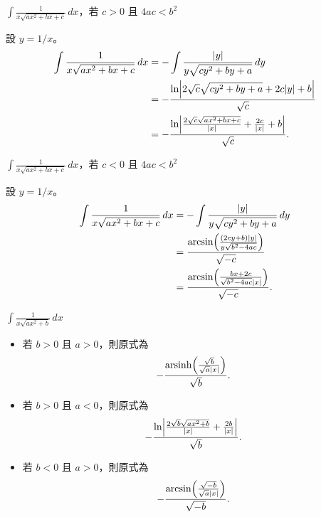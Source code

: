 \documentclass{beamer}
\newcommand{\Left} {\mathopen{}\mathclose\bgroup\left}
\newcommand{\Right}{\aftergroup\egroup\right}
\newcommand{\arsinh}{\operatorname{arsinh}}
\theoremstyle{remark}
\begin{document}
\begin{CJK}{UTF8}{bsmi}
\begin{frame}{$\displaystyle \int \frac{1}{x \sqrt{ax^2 + bx + c}}\,dx$，若 $c > 0$ 且 $4ac < b^2$}
  \begin{solution}
    設 $y = 1/x$。
    \begin{align*}
      \int \frac{1}{x \sqrt{ax^2 + bx + c}}\,dx &= -\int \frac{|y|}{y \sqrt{cy^2 + by + a}}\,dy\\
	&= -\frac{\ln \Left| 2 \sqrt c \sqrt{cy^2 + by + a} + 2c|y| + b \Right|}{\sqrt c}\\
	&= -\frac{\ln \Left| \frac{2 \sqrt c \sqrt{ax^2 + bx + c}}{|x|} + \frac{2c}{|x|} + b \Right|}{\sqrt c}.
    \end{align*}
  \end{solution}
\end{frame}

\begin{frame}{$\displaystyle \int \frac{1}{x \sqrt{ax^2 + bx + c}}\,dx$，若 $c < 0$ 且 $4ac < b^2$}
  \begin{solution}
    設 $y = 1/x$。
    \begin{align*}
      \int \frac{1}{x \sqrt{ax^2 + bx + c}}\,dx &= -\int \frac{|y|}{y \sqrt{cy^2 + by + a}}\,dy\\
	&= \frac{\arcsin \Left( \frac{\left( 2cy + b \right) |y|}{y \sqrt{b^2 - 4ac}} \Right)}{\sqrt{-c}}\\
	&= \frac{\arcsin \Left( \frac{bx + 2c}{\sqrt{b^2 - 4ac} |x|} \Right)}{\sqrt{-c}}.
    \end{align*}
  \end{solution}
\end{frame}

\begin{frame}{$\displaystyle \int \frac{1}{x \sqrt{ax^2 + b}}\,dx$}
  \begin{itemize}
    \item 若 $b > 0$ 且 $a > 0$，則原式為
      \[-\frac{\arsinh \Left( \frac{\sqrt b}{\sqrt a |x|} \Right)}{\sqrt b}.\]
    \item 若 $b > 0$ 且 $a < 0$，則原式為
      \[-\frac{\ln \Left| \frac{2 \sqrt b \sqrt{ax^2 + b}}{|x|} + \frac{2b}{|x|} \Right|}{\sqrt b}.\]
    \item 若 $b < 0$ 且 $a > 0$，則原式為
      \[-\frac{\arcsin \Left( \frac{\sqrt{-b}}{\sqrt a |x|} \Right)}{\sqrt{-b}}.\]
  \end{itemize}
\end{frame}


\end{CJK}
\end{document}
